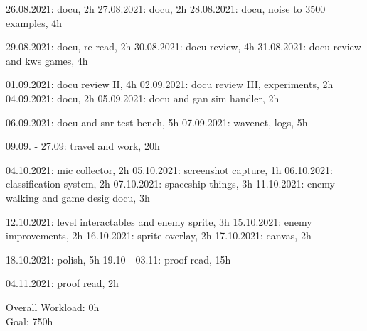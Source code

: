 26.08.2021: docu, 2h
27.08.2021: docu, 2h
28.08.2021: docu, noise to 3500 examples, 4h

29.08.2021: docu, re-read, 2h
30.08.2021: docu review, 4h
31.08.2021: docu review and kws games, 4h

01.09.2021: docu review II, 4h
02.09.2021: docu review III, experiments, 2h
04.09.2021: docu, 2h
05.09.2021: docu and gan sim handler, 2h

06.09.2021: docu and snr test bench, 5h
07.09.2021: wavenet, logs, 5h

09.09. - 27.09: travel and work, 20h

04.10.2021: mic collector, 2h
05.10.2021: screenshot capture, 1h
06.10.2021: classification system, 2h
07.10.2021: spaceship things, 3h
11.10.2021: enemy walking and game desig docu, 3h

12.10.2021: level interactables and enemy sprite, 3h
15.10.2021: enemy improvements, 2h
16.10.2021: sprite overlay, 2h
17.10.2021: canvas, 2h

18.10.2021: polish, 5h
19.10 - 03.11: proof read, 15h

04.11.2021: proof read, 2h

\vspace{0.5cm}
\noindent
Overall Workload: 0h\\
Goal: 750h